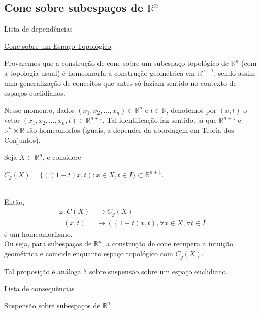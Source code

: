 \subsection{Cone sobre subespaços de $\mathbb{R}^n$}
\label{cone-euclidiano-prop}
\begin{titlemize}{Lista de dependências}
	\item \hyperref[cone-def]{Cone sobre um Espaço Topológico}.
\end{titlemize}
Provaremos que a construção de cone sobre um subespaço topológico de $\mathbb{R}^n$ (com a topologia usual) é homeomorfa à construção geométrica em $\mathbb{R}^{n+1}$, sendo assim uma generalização de conceitos que antes só faziam sentido no contexto de espaços euclidianos.

Nesse momento, dados $(x_1,x_2,...,x_n) \in \mathbb{R}^n$ e $t \in \mathbb{R}$, denotemos por $(x,t)$ o vetor $(x_1,x_2,...,x_n,t) \in \mathbb{R}^{n+1}$. Tal identificação faz sentido, já que $\mathbb{R}^{n+1}$ e $\mathbb{R}^{n}\times\mathbb{R}$ são homeomorfos (iguais, a depender da abordagem em Teoria dos Conjuntos).

\begin{prop}
	Seja $X \subset \mathbb{R}^n$, e considere\\
    \centerline{$C_g(X) = \{((1-t)x,t):x\in X, t\in I\} \subset \mathbb{R}^{n+1}$.}\\
    Então,\begin{align*}
        \varphi: C(X) &\rightarrow C_g(X)\\
        [(x,t)] &\mapsto ((1-t)x,t), \forall x\in X, \forall t \in I
    \end{align*}
    é um homeomorfismo.\\
    Ou seja, para subespaços de $\mathbb{R}^n$, a construção de cone recupera a intuição geométrica e coincide enquanto espaço topológico com $C_g(X)$.

    
\end{prop}

Tal proposição é análoga à sobre \hyperref[suspensao-euclidiano-prop]{suspensão sobre um espaço euclidiano}.

\begin{titlemize}{Lista de consequências}
    \item \hyperref[suspensao-euclidiano-prop]{Suspensão sobre subespaços de $\mathbb{R}^n$}
\end{titlemize}